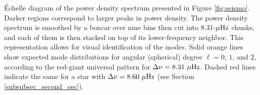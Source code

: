 \label{fig:echelle} \'Echelle diagram of the power density spectrum presented in Figure \ref{fig:seismo}. Darker regions correspond to larger peaks in power density. The power density spectrum is smoothed by a boxcar over nine bins then cut into 8.31-$\mu\rm{Hz}$ chunks, and each of them is then stacked on top of its lower-frequency neighbor. This representation allows for visual identification of the modes. Solid orange lines show expected mode distributions for angular (spherical) degree $\ell = 0$, $1$, and $2$, according to the red-giant universal pattern \citep{mos11} for $\Delta\nu = 8.31\ \mu\rm{Hz}$. Dashed red lines indicate the same for a star with $\Delta\nu = 8.60\ \mu\rm{Hz}$ (see Section \ref{subsubsec_second_osc}).
